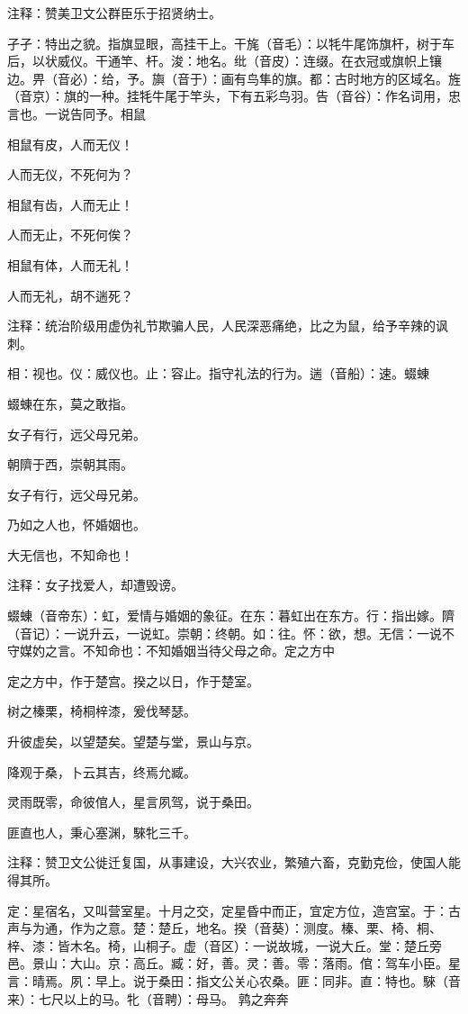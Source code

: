 \documentclass[12pt,UTF8]{ctexbook}
\begin{document}
注释：赞美卫文公群臣乐于招贤纳士。

孑孑：特出之貌。指旗显眼，高挂干上。干旄（音毛）：以牦牛尾饰旗杆，树于车后，以状威仪。干通竿、杆。浚：地名。纰（音皮）：连缀。在衣冠或旗帜上镶边。畀（音必）：给，予。旟（音于）：画有鸟隼的旗。都：古时地方的区域名。旌（音京）：旗的一种。挂牦牛尾于竿头，下有五彩鸟羽。告（音谷）：作名词用，忠言也。一说告同予。相鼠

相鼠有皮，人而无仪！

人而无仪，不死何为？

相鼠有齿，人而无止！

人而无止，不死何俟？

相鼠有体，人而无礼！

人而无礼，胡不遄死？

注释：统治阶级用虚伪礼节欺骗人民，人民深恶痛绝，比之为鼠，给予辛辣的讽刺。

相：视也。仪：威仪也。止：容止。指守礼法的行为。遄（音船）：速。蝃蝀

蝃蝀在东，莫之敢指。

女子有行，远父母兄弟。

朝隮于西，崇朝其雨。

女子有行，远父母兄弟。

乃如之人也，怀婚姻也。

大无信也，不知命也！

注释：女子找爱人，却遭毁谤。

蝃蝀（音帝东）：虹，爱情与婚姻的象征。在东：暮虹出在东方。行：指出嫁。隮（音记）：一说升云，一说虹。崇朝：终朝。如：往。怀：欲，想。无信：一说不守媒妁之言。不知命也：不知婚姻当待父母之命。定之方中

定之方中，作于楚宫。揆之以日，作于楚室。

树之榛栗，椅桐梓漆，爰伐琴瑟。

升彼虚矣，以望楚矣。望楚与堂，景山与京。

降观于桑，卜云其吉，终焉允臧。

灵雨既零，命彼倌人，星言夙驾，说于桑田。

匪直也人，秉心塞渊，騋牝三千。

注释：赞卫文公徙迁复国，从事建设，大兴农业，繁殖六畜，克勤克俭，使国人能得其所。

定：星宿名，又叫营室星。十月之交，定星昏中而正，宜定方位，造宫室。于：古声与为通，作为之意。楚：楚丘，地名。揆（音葵）：测度。榛、栗、椅、桐、梓、漆：皆木名。椅，山桐子。虚（音区）：一说故城，一说大丘。堂：楚丘旁邑。景山：大山。京：高丘。臧：好，善。灵：善。零：落雨。倌：驾车小臣。星言：晴焉。夙：早上。说于桑田：指文公关心农桑。匪：同非。直：特也。騋（音来）：七尺以上的马。牝（音聘）：母马。 鹑之奔奔
\end{document}
